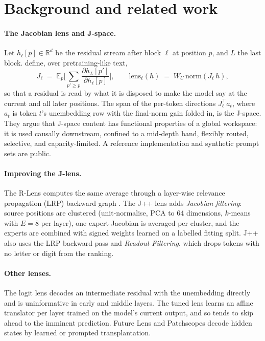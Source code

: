 \documentclass[11pt]{article}
\theoremstyle{definition}
\newcommand{\E}{\mathbb{E}}
\newcommand{\R}{\mathbb{R}}
\newcommand{\Jl}{J_{\ell}}
\begin{document}
\section{Background and related work}
\label{sec:background}

\paragraph{The Jacobian lens and J-space.}
Let $h_\ell[p]\in\R^d$ be the residual stream after block $\ell$ at position $p$, and $L$ the last
block. \citet{gurnee2026workspace} define, over pretraining-like text,
\begin{equation}
\label{eq:jlens}
\Jl \;=\; \E_{p}\Big[\sum_{p'\ge p} \frac{\partial h_L[p']}{\partial h_\ell[p]}\Big],
\qquad
\text{lens}_\ell(h) \;=\; W_U\,\mathrm{norm}(\Jl\, h),
\end{equation}
so that a residual is read by what it is disposed to make the model say at the current and all later
positions. The span of the per-token directions $\Jl^{\top} a_t$, where $a_t$ is token $t$'s
unembedding row with the final-norm gain folded in, is the J-space. They argue that J-space content
has functional properties of a global workspace: it is used causally downstream, confined to a
mid-depth band, flexibly routed, selective, and capacity-limited. A reference implementation and
synthetic prompt sets are public.

\paragraph{Improving the J-lens.}
The R-Lens \citep{blank2026rlens} computes the same average through a layer-wise relevance
propagation (LRP) backward graph \citep{bach2015lrp}. The J++ lens \citep{ayonrinde2026jpp} adds
\emph{Jacobian filtering}: source positions are clustered (unit-normalise, PCA to 64 dimensions,
$k$-means with $E=8$ per layer), one expert Jacobian is averaged per cluster, and the experts are
combined with signed weights learned on a labelled fitting split. J++ also uses the LRP backward
pass and \emph{Readout Filtering}, which drops tokens with no letter or digit from the ranking.

\paragraph{Other lenses.}
The logit lens \citep{nostalgebraist2020logitlens} decodes an intermediate residual with the
unembedding directly and is uninformative in early and middle layers. The tuned lens
\citep{belrose2023tuned} learns an affine translator per layer trained on the model's current output,
and so tends to skip ahead to the imminent prediction. Future Lens \citep{pal2023future} and
Patchscopes \citep{ghandeharioun2024patchscopes} decode hidden states by learned or prompted
transplantation.
\end{document}
